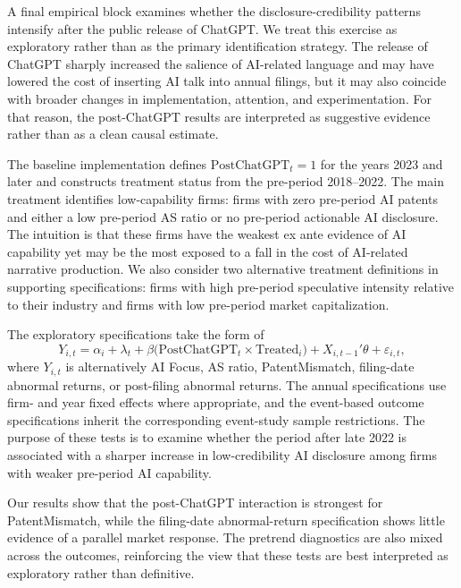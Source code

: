 A final empirical block examines whether the disclosure-credibility patterns intensify after the public release of ChatGPT. We treat this exercise as exploratory rather than as the primary identification strategy. The release of ChatGPT sharply increased the salience of AI-related language and may have lowered the cost of inserting AI talk into annual filings, but it may also coincide with broader changes in implementation, attention, and experimentation. For that reason, the post-ChatGPT results are interpreted as suggestive evidence rather than as a clean causal estimate.

The baseline implementation defines $\mathrm{PostChatGPT}_t=1$ for the years 2023 and later and constructs treatment status from the pre-period 2018--2022. The main treatment identifies low-capability firms: firms with zero pre-period AI patents and either a low pre-period AS ratio or no pre-period actionable AI disclosure. The intuition is that these firms have the weakest ex ante evidence of AI capability yet may be the most exposed to a fall in the cost of AI-related narrative production. We also consider two alternative treatment definitions in supporting specifications: firms with high pre-period speculative intensity relative to their industry and firms with low pre-period market capitalization.

The exploratory specifications take the form of
\[
Y_{i,t}
=
\alpha_i + \lambda_t + \beta \big(\mathrm{PostChatGPT}_t \times \mathrm{Treated}_i\big) + X_{i,t-1}'\theta + \varepsilon_{i,t},
\]
where $Y_{i,t}$ is alternatively AI Focus, AS ratio, PatentMismatch, filing-date abnormal returns, or post-filing abnormal returns. The annual specifications use firm- and year fixed effects where appropriate, and the event-based outcome specifications inherit the corresponding event-study sample restrictions. The purpose of these tests is to examine whether the period after late 2022 is associated with a sharper increase in low-credibility AI disclosure among firms with weaker pre-period AI capability.

Our results show that the post-ChatGPT interaction is strongest for PatentMismatch, while the filing-date abnormal-return specification shows little evidence of a parallel market response. The pretrend diagnostics are also mixed across the outcomes, reinforcing the view that these tests are best interpreted as exploratory rather than definitive.